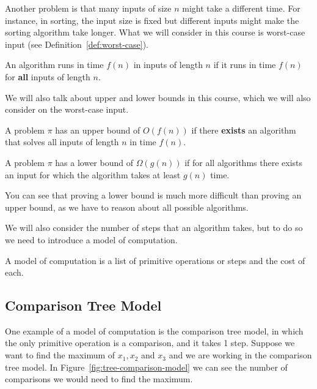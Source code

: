 Another problem is that many inputs of size $n$ might take a different time. For instance, in sorting, the input size is fixed but different
inputs might make the sorting algorithm take longer. What we will
consider in this course is worst-case input (see Definition~\ref{def:worst-case}).

\begin{definition}\label{def:worst-case}
    An algorithm runs in time $f(n)$ in inputs of length $n$ if it runs in time $f(n)$ for \textbf{all} inputs of length $n$.
\end{definition}

We will also talk about upper and lower bounds in this course, which 
we will also consider on the worst-case input.

\begin{definition}
    A problem $\pi$ has an upper bound of $O(f(n))$ if there 
    \textbf{exists} an algorithm that solves all inputs of length
    $n$ in time $f(n)$.
\end{definition}

\begin{definition}
    A problem $\pi$ has a lower bound of $\Omega(g(n))$ if for all
    algorithms there exists an input for which the algorithm
    takes at least $g(n)$ time.
\end{definition}

You can see that proving a lower bound is much more difficult than
proving an upper bound, as we have to reason about all possible algorithms.

We will also consider the number of steps that an algorithm takes,
but to do so we need to introduce a model of computation.

\begin{definition}
    A model of computation is a list of primitive operations or steps and the cost of each.
\end{definition}

\subsection{Comparison Tree Model}

One example of a model of computation is the comparison tree model,
in which the only primitive operation is a comparison, and it takes
1 step. Suppose we want to find the maximum of $x_1, x_2$ and $x_3$ and we are working in the comparison tree model. In Figure~\ref{fig:tree-comparison-model} we can see the number of comparisons
we would need to find the maximum.

